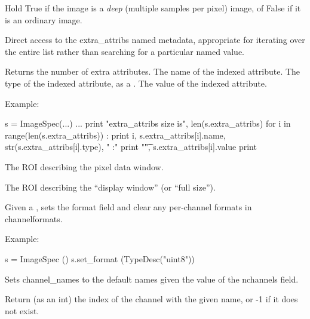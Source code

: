 Hold {\cf True} if the image is a \emph{deep} (multiple samples per pixel)
image, of {\cf False} if it is an ordinary image.
\apiend

Direct access to the {\cf extra_attribs} named metadata, appropriate for
iterating over the entire list rather than searching for a particular named
value.

\vspace{-10pt}
\vspace{10pt}
Returns the number of extra attributes.
\apiend
\vspace{-24pt}
\vspace{10pt}
The name of the indexed attribute.
\apiend
\vspace{-24pt}
\vspace{10pt}
The type of the indexed attribute, as a \TypeDesc.
\apiend
\vspace{-24pt}
\vspace{10pt}
The value of the indexed attribute.
\apiend

\noindent Example:
\begin{code}
    s = ImageSpec(...)
    ...
    print "extra_attribs size is", len(s.extra_attribs)
    for i in range(len(s.extra_attribs)) :
        print i, s.extra_attribs[i].name, str(s.extra_attribs[i].type), " :"
        print "\t", s.extra_attribs[i].value
    print
\end{code}
\apiend

The ROI describing the pixel data window.
\apiend

The ROI describing the ``display window'' (or ``full size'').
\apiend

Given a \TypeDesc, sets the {\cf format} field and
clear any per-channel formats in {\cf channelformats}.

\noindent Example:
\begin{code}
    s = ImageSpec ()
    s.set_format (TypeDesc("uint8"))
\end{code}
\apiend

Sets {\cf channel_names} to the default names given the value of
the {\cf nchannels} field.
\apiend

Return (as an int) the index of the channel with the given name, or -1
if it does not exist.
\apiend

